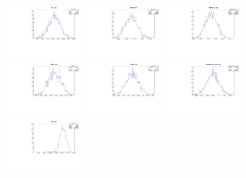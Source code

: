 \begin{figure}[tb]
   \begin{center}
	\includegraphics[width=0.3\textwidth]{figs/MCVars/fL_var.pdf}
	\includegraphics[width=0.3\textwidth]{figs/MCVars/fpe_var.pdf}
	\includegraphics[width=0.3\textwidth]{figs/MCVars/phis_0_var.pdf}
	\includegraphics[width=0.3\textwidth]{figs/MCVars/dpe_var.pdf}
	\includegraphics[width=0.3\textwidth]{figs/MCVars/dpa_var.pdf}
	\includegraphics[width=0.3\textwidth]{figs/MCVars/lambda_0_abs_var.pdf}
	\includegraphics[width=0.3\textwidth]{figs/MCVars/G_var.pdf}

\end{center}
\end{figure}
